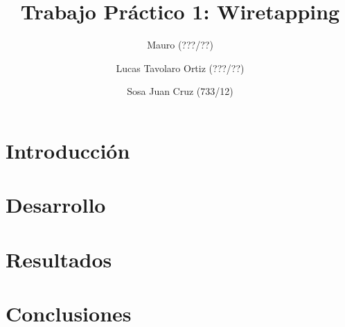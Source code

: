 \documentclass[final,inline,a4paper,narroweqnarray]{ieee}
\let\Oldsection\section
\renewcommand{\section}{\FloatBarrier\Oldsection}
\begin{document}
\title[TP 1: Wiretapping]{%
Trabajo Práctico 1: Wiretapping}

\author[Mauro, Ortiz, Sosa]{%
	Mauro (???/??)
	\and
	Lucas Tavolaro Ortiz (???/??)
	\and
	Sosa Juan Cruz (733/12)
}

\maketitle

\begin{abstract}



\end{abstract}


\section{ Introducción }


\section{Desarrollo}


\section{Resultados}


\section{Conclusiones}

\end{document}
